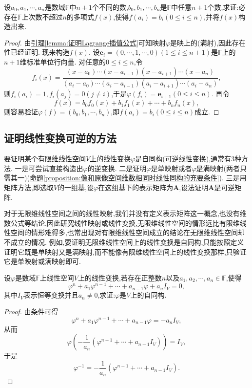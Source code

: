 \documentclass[../../main.tex]{subfiles}%
\begin{document}
\begin{theorem}[Lagrange插值公式]\label{theorem:Lagrange插值公式}
设\(a_0,a_1,\cdots,a_n\)是数域\(\mathbb{F}\)中\(n + 1\)个不同的数,\(b_0,b_1,\cdots,b_n\)是\(\mathbb{F}\)中任意\(n + 1\)个数,求证:必存在\(\mathbb{F}\)上次数不超过\(n\)的多项式\(f(x)\),使得\(f(a_i)=b_i(0\leqslant  i\leqslant  n)\),并将\(f(x)\)构造出来.
\end{theorem}
\begin{proof}

由\hyperref[lemma:证明Lagrange插值公式]{引理\ref{lemma:证明Lagrange插值公式}}可知映射\(\varphi\)是映上的(满射),因此存在性已经证明. 现来构造\(f(x)\). 设\(\boldsymbol{e}_i=(0,\cdots,1,\cdots,0)(1\leqslant  i\leqslant  n + 1)\)是\(\mathbb{F}\)上的\(n + 1\)维标准单位行向量. 对任意的\(0\leqslant  i\leqslant  n\),令
\[
f_i(x)=\frac{(x - a_0)\cdots(x - a_{i - 1})(x - a_{i + 1})\cdots(x - a_n)}{(a_i - a_0)\cdots(a_i - a_{i - 1})(a_i - a_{i + 1})\cdots(a_i - a_n)},
\]
则\(f_i(a_i)=1,f_i(a_j)=0(j\neq i)\),于是\(\varphi(f_i)=\boldsymbol{e}_{i + 1}(0\leqslant  i\leqslant  n)\). 再令
\[
f(x)=b_0f_0(x)+b_1f_1(x)+\cdots + b_nf_n(x),
\]
则容易验证\(\varphi(f)=(b_0,b_1,\cdots,b_n)\),即\(f(a_i)=b_i(0\leqslant  i\leqslant  n)\)成立. 

\end{proof}

\subsection{证明线性变换可逆的方法}

要证明某个有限维线性空间\(V\)上的线性变换\(\varphi\)是自同构(可逆线性变换),通常有\(3\)种方法. 一是可尝试直接构造出\(\varphi\)的逆变换. 二是证明\(\varphi\)是单映射或者\(\varphi\)是满映射(两者只需其一)(\hyperref[proposition:像和原像空间维数相同时线性同构的充要条件]{命题\ref{proposition:像和原像空间维数相同时线性同构的充要条件}}). 三是用矩阵方法,即选取\(V\)的一组基,设\(\varphi\)在这组基下的表示矩阵为\(\boldsymbol{A}\),设法证明\(\boldsymbol{A}\)是可逆矩阵. 

对于无限维线性空间之间的线性映射,我们并没有定义表示矩阵这一概念,也没有维数公式等结论,因此研究线性映射或线性变换,无限维线性空间的情形远比有限维线性空间的情形难得多,也常出现对有限维线性空间成立的结论在无限维线性空间却不成立的情况. 例如,要证明无限维线性空间上的线性变换是自同构,只能按照定义证明它既是单映射又是满映射,而不能像有限维线性空间上的线性变换那样,只验证它是单映射或满映射即可.
\begin{example}
设\(\varphi\)是数域\(\mathbb{F}\)上线性空间\(V\)上的线性变换,若存在正整数\(n\)以及\(a_1,a_2,\cdots,a_n\in\mathbb{F}\),使得
\[
\varphi^{n}+a_1\varphi^{n - 1}+\cdots+a_{n - 1}\varphi+a_nI_V = 0,
\]
其中\(I_V\)表示恒等变换并且\(a_n\neq 0\),求证:\(\varphi\)是\(V\)上的自同构.
\end{example}
\begin{proof}

由条件可得
\[
\varphi^{n}+a_1\varphi^{n - 1}+\cdots+a_{n - 1}\varphi=-a_nI_V,
\]
从而
\[
\varphi\left(-\frac{1}{a_n}(\varphi^{n - 1}+\cdots+a_{n - 1}I_V)\right)=I_V,
\]
于是
\[
\varphi^{-1}=-\frac{1}{a_n}(\varphi^{n - 1}+\cdots+a_{n - 1}I_V). 
\]

\end{proof}
\end{document}
